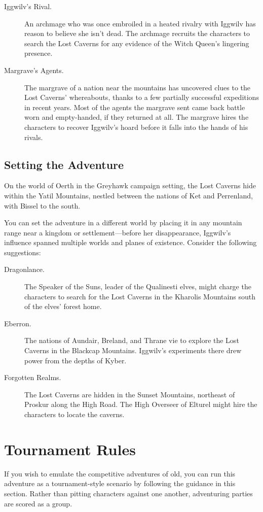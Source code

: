 \documentclass[10pt,a4paper,twoside,bg=print,twocolumn,openany,nodeprecatedcode]{dndbook}
\begin{document}
\begin{description}
\item[Iggwilv's Rival.]
An archmage who was once embroiled in a heated rivalry with Iggwilv has reason to believe she isn't dead. The archmage recruits the characters to search the Lost Caverns for any evidence of the Witch Queen's lingering presence.
\item[Margrave's Agents.]
The margrave of a nation near the mountains has uncovered clues to the Lost Caverns' whereabouts, thanks to a few partially successful expeditions in recent years. Most of the agents the margrave sent came back battle worn and empty-handed, if they returned at all. The margrave hires the characters to recover Iggwilv's hoard before it falls into the hands of his rivals.
\end{description}

\subsection{Setting the Adventure}
On the world of Oerth in the Greyhawk campaign setting, the Lost Caverns hide within the Yatil Mountains, nestled between the nations of Ket and Perrenland, with Bissel to the south.

You can set the adventure in a different world by placing it in any mountain range near a kingdom or settlement—before her disappearance, Iggwilv's influence spanned multiple worlds and planes of existence. Consider the following suggestions:


\begin{description}
\item[Dragonlance.]
The Speaker of the Suns, leader of the Qualinesti elves, might charge the characters to search for the Lost Caverns in the Kharolis Mountains south of the elves' forest home.
\item[Eberron.]
The nations of Aundair, Breland, and Thrane vie to explore the Lost Caverns in the Blackcap Mountains. Iggwilv's experiments there drew power from the depths of Kyber.
\item[Forgotten Realms.]
The Lost Caverns are hidden in the Sunset Mountains, northeast of Proskur along the High Road. The High Overseer of Elturel might hire the characters to locate the caverns.
\end{description}

\section{Tournament Rules}
If you wish to emulate the competitive adventures of old, you can run this adventure as a tournament-style scenario by following the guidance in this section. Rather than pitting characters against one another, adventuring parties are scored as a group.
\end{document}
